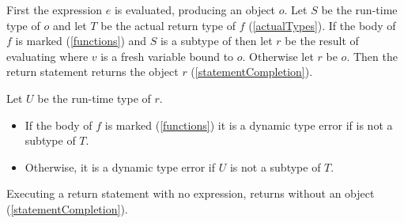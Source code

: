 \documentclass[makeidx]{article}
\begin{document}
{\LMHash{}%
First the expression $e$ is evaluated, producing an object $o$.
Let $S$ be the run-time type of $o$ and
let $T$ be the actual return type of $f$
(\ref{actualTypes}).
If the body of $f$ is marked \ASYNC{} (\ref{functions})
and $S$ is a subtype of 
then let $r$ be the result of evaluating 
where $v$ is a fresh variable bound to $o$.
Otherwise let $r$ be $o$.
Then the return statement returns the object $r$
(\ref{statementCompletion}).


\LMHash{}%
Let $U$ be the run-time type of $r$.

\begin{itemize}
\item
  If the body of $f$ is marked \ASYNC{} (\ref{functions})
  it is a dynamic type error if  is not a subtype of $T$.
\item
  Otherwise, it is a dynamic type error if $U$ is not a subtype of $T$.
\end{itemize}

\LMHash{}%
Executing a return statement with no expression,
\code{\RETURN;}
returns without an object
(\ref{statementCompletion}).


}
\end{document}
